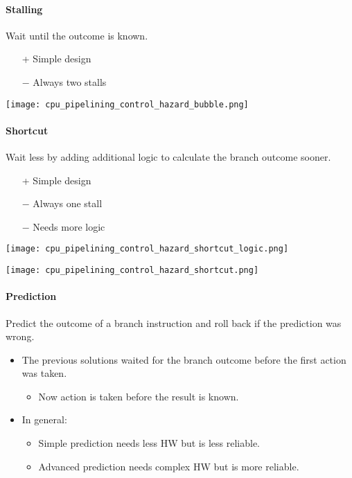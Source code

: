 \paragraph{Stalling}\label{contr_stalling}

Wait until the outcome is known.
\begin{itemize}
    \item[+] Simple design
    \item[$-$] Always two stalls
\end{itemize}

\texttt{[image: cpu\_pipelining\_control\_hazard\_bubble.png]}

\paragraph{Shortcut}\label{shortcut}

Wait less by adding additional logic to calculate the branch outcome sooner.

\begin{itemize}
    \item[+] Simple design
    \item[$-$] Always one stall
    \item[$-$] Needs more logic
\end{itemize}

\texttt{[image: cpu\_pipelining\_control\_hazard\_shortcut\_logic.png]}

\texttt{[image: cpu\_pipelining\_control\_hazard\_shortcut.png]}

\paragraph{Prediction}\label{prediction}
Predict the outcome of a branch instruction and roll back if the prediction was wrong.
\begin{itemize}
    \item The previous solutions waited for the branch outcome before the first action was taken.
          \begin{itemize}
              \item Now action is taken before the result is known.
          \end{itemize}
    \item In general:
          \begin{itemize}
              \item Simple prediction needs less HW but is less reliable.
              \item Advanced prediction needs complex HW but is more reliable.
          \end{itemize}
\end{itemize}

